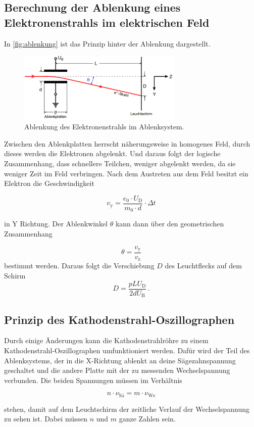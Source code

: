 \subsection{Berechnung der Ablenkung eines Elektronenstrahls im elektrischen Feld}
\label{ssec:t2}

In \autoref{fig:ablenkung} ist das Prinzip hinter der Ablenkung dargestellt.

\begin{figure}
    \centering
    \includegraphics[width=0.7\textwidth]{images/bild2.png}
    \caption{Ablenkung des Elektronenstrahls im Ablenksystem.}
    \label{fig:ablenkung}
\end{figure}

Zwischen den Ablenkplatten herrscht näherungsweise in homogenes Feld, durch dieses werden die Elektronen abgelenkt.
Und daraus folgt der logische Zusammenhang, dass schnellere Teilchen, weniger abgelenkt werden, da sie weniger Zeit im Feld verbringen.
Nach dem Austreten aus dem Feld besitzt ein Elektron die Geschwindigkeit

\begin{equation}
    v_\text{y} = \frac{e_0 \cdot U_\text{D}}{m_0 \cdot d} \cdot \Delta t
    \label{eq:yges}
\end{equation}

in Y Richtung.
Der Ablenkwinkel $\theta$ kann dann über den geometrischen Zusammenhang

\begin{equation}
    \theta = \frac{v_\text{y}}{v_\text{z}}
    \label{eq:theta1}
\end{equation}
bestimmt werden.
Daraus folgt die Verschiebung $D$ des Leuchtflecks auf dem Schirm
\begin{equation}
    D = \frac{p L U_\text{D}}{2 d U_\text{B}} \, .
    \label{eq:verschiebung}
\end{equation}


\subsection{Prinzip des Kathodenstrahl-Oszillographen}
\label{ssec:t3}

Durch einige Änderungen kann die Kathodenstrahlröhre zu einem Kathodenstrahl-Oszillographen umfunktioniert werden.
Dafür wird der Teil des Ablenksystems, der in die X-Richtung ablenkt an deine Sägezahnspannung geschaltet und die andere Platte mit der zu messenden Wechselspannung verbunden.
Die beiden Spannungen müssen im Verhältnis 

\begin{equation}
n \cdot \nu _\text{Sä} = m \cdot \nu _\text{We}
    \label{eq:verh}
\end{equation}

stehen, damit auf dem Leuchtschirm der zeitliche Verlauf der Wechselspannung zu sehen ist.
Dabei müssen $n$ und $m$ ganze Zahlen sein.